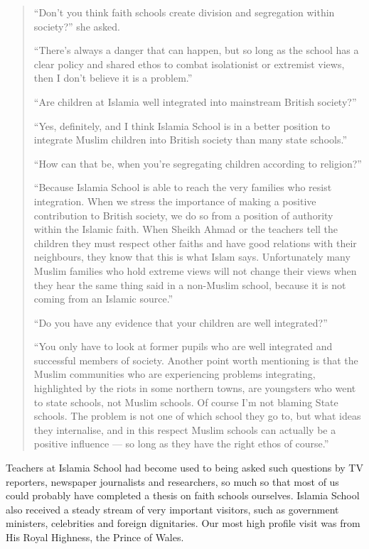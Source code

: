 \documentclass[12pt]{memoir}
\begin{document}
\begin{quote}
“Don’t you think faith schools create division
and segregation within society?” she asked.

“There’s always a danger that can happen,
but so long as the school has a clear policy
and shared ethos to combat isolationist or extremist views,
then I don’t believe it is a problem.”

“Are children at Islamia well integrated into mainstream British society?”

“Yes, definitely, and I think Islamia School is in a better position
to integrate Muslim children into British society than many state schools.”

“How can that be, when you’re segregating children according to religion?”

“Because Islamia School is able to reach the very families
who resist integration.
When we stress the importance of making
a positive contribution to British society,
we do so from a position of authority within the Islamic faith.
When Sheikh Ahmad or the teachers tell the children
they must respect other faiths and have good relations with their neighbours,
they know that this is what Islam says.
Unfortunately many Muslim families who hold extreme views
will not change their views when they hear the same thing
said in a non-Muslim school,
because it is not coming from an Islamic source.”

“Do you have any evidence that your children are well integrated?”

“You only have to look at former pupils who are well integrated
and successful members of society.
Another point worth mentioning is that the Muslim communities
who are experiencing problems integrating,
highlighted by the riots in some northern towns,
are youngsters who went to state schools, not Muslim schools.
Of course I’m not blaming State schools.
The problem is not one of which school they go to,
but what ideas they internalise,
and in this respect Muslim schools can actually be a positive influence —
so long as they have the right ethos of course.”
\end{quote}

Teachers at Islamia School had become used to being asked
such questions by TV reporters,
newspaper journalists and researchers,
so much so that most of us could probably have
completed a thesis on faith schools ourselves.
Islamia School also received a steady stream of very important visitors,
such as government ministers, celebrities and foreign dignitaries.
Our most high profile visit was from His Royal Highness, the Prince of Wales.
\end{document}
